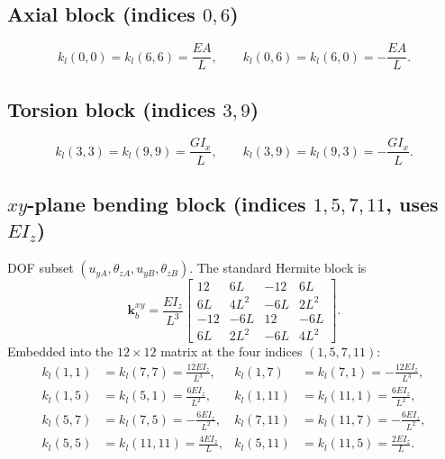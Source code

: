 \documentclass[11pt,a4paper]{article}
\newcommand{\bmath}[1]{\boldsymbol{#1}}
\begin{document}
\subsection{Axial block (indices $0, 6$)}
\[
k_l(0,0) = k_l(6,6) = \frac{EA}{L}, \qquad k_l(0,6) = k_l(6,0) = -\frac{EA}{L}.
\]

\subsection{Torsion block (indices $3, 9$)}
\[
k_l(3,3) = k_l(9,9) = \frac{G I_x}{L}, \qquad k_l(3,9) = k_l(9,3) = -\frac{G I_x}{L}.
\]

\subsection{$xy$-plane bending block (indices $1, 5, 7, 11$, uses $E I_z$)}
DOF subset $(u_{yA}, \theta_{zA}, u_{yB}, \theta_{zB})$. The standard Hermite block is
\[
\bmath{k}^{xy}_b = \frac{E I_z}{L^3}\begin{bmatrix}
12 & 6L & -12 & 6L \\
6L & 4L^2 & -6L & 2L^2 \\
-12 & -6L & 12 & -6L \\
6L & 2L^2 & -6L & 4L^2
\end{bmatrix}.
\]
Embedded into the $12\times 12$ matrix at the four indices $(1, 5, 7, 11)$:
\begin{align*}
k_l(1,1) &= k_l(7,7) = \tfrac{12 E I_z}{L^3},   & k_l(1,7)  &= k_l(7,1)  = -\tfrac{12 E I_z}{L^3}, \\
k_l(1,5) &= k_l(5,1) = \tfrac{6 E I_z}{L^2},    & k_l(1,11) &= k_l(11,1) =  \tfrac{6 E I_z}{L^2}, \\
k_l(5,7) &= k_l(7,5) = -\tfrac{6 E I_z}{L^2},   & k_l(7,11) &= k_l(11,7) = -\tfrac{6 E I_z}{L^2}, \\
k_l(5,5) &= k_l(11,11) = \tfrac{4 E I_z}{L},    & k_l(5,11) &= k_l(11,5) =  \tfrac{2 E I_z}{L}.
\end{align*}
\end{document}
